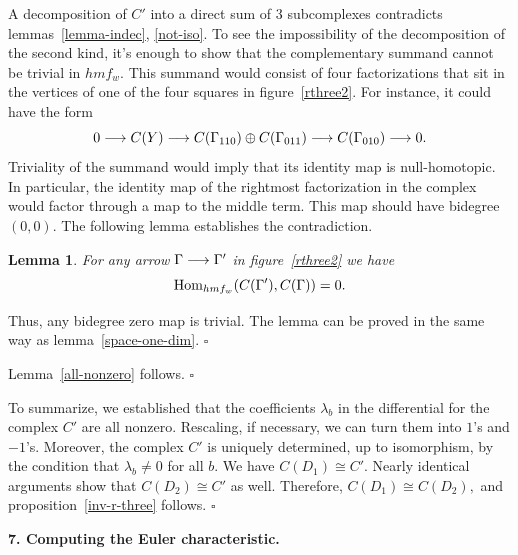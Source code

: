 \documentclass[12pt]{article}
\newtheorem{lemma}{Lemma}
\begin{document}
A decomposition of $C'$ into a direct sum of 3 subcomplexes 
contradicts lemmas~\ref{lemma-indec}, \ref{not-iso}. To see the 
impossibility of the decomposition of 
the second kind, it's enough to show that the complementary summand 
cannot be trivial in $hmf_w.$ This summand would consist of four factorizations 
that sit in the vertices of one of the four squares in figure~\ref{rthree2}. 
For instance, it could have the form 
$$ 0 \longrightarrow C(Y) \longrightarrow C(\Gamma_{110})\oplus C(\Gamma_{011}) \longrightarrow 
  C(\Gamma_{010}) \longrightarrow 0.$$ 
Triviality of the summand would imply that its identity map is null-homotopic. 
In particular, the identity map of the rightmost factorization in the complex would 
factor through a map to the middle term. This map should have bidegree $(0,0).$ 
The following lemma establishes the contradiction. 

\begin{lemma} For any arrow $\Gamma \longrightarrow \Gamma'$ in figure~\ref{rthree2} 
we have  
$$\mathrm{Hom}_{hmf_w}(C(\Gamma'), C(\Gamma)) = 0.$$
\end{lemma} 
Thus, any bidegree zero map is trivial. The lemma can be proved in the 
same way as lemma~\ref{space-one-dim}. $\square$ 

\vspace{0.1in} 

Lemma~\ref{all-nonzero} follows. $\square$ 

\vspace{0.1in} 

To summarize, we established that the coefficients $\lambda_b$ 
in the differential for the complex $C'$ are all nonzero. Rescaling, if necessary, 
we can turn them into $1$'s and $-1$'s. Moreover, the complex $C'$ is uniquely 
determined, up to isomorphism, by the condition that $\lambda_b\not= 0$ for 
all $b.$ We have $C(D_1)\cong C'.$ Nearly identical arguments show that $C(D_2) \cong C'$ 
as well. Therefore, $C(D_1) \cong C(D_2),$ and proposition~\ref{inv-r-three} follows. $\square$ 

\vspace{0.15in} 






{\bf 7. Computing the Euler characteristic.} 

\vspace{0.1in} 
\end{document}
